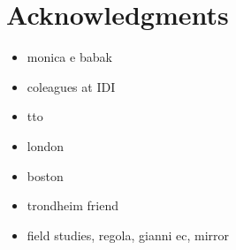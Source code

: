 \chapter*{Acknowledgments}

\begin{itemize}
\itemsep1pt\parskip0pt
\item
  monica e babak
\item
  coleagues at IDI
\item
  tto
\item
  london
\item
  boston
\item
  trondheim friend
\item
  field studies, regola, gianni ec, mirror
\end{itemize}
